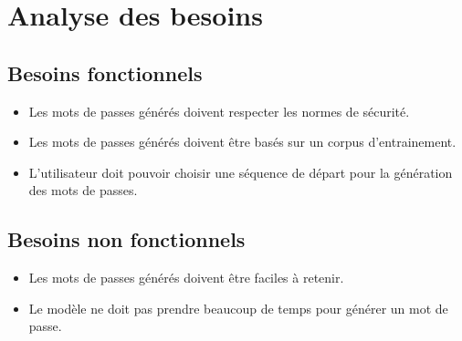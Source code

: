 \section{Analyse des besoins}
\subsection{Besoins fonctionnels}
\begin{itemize}
    \item Les mots de passes générés doivent respecter les normes de sécurité.
    \item Les mots de passes générés doivent être basés sur un corpus d'entrainement.
    \item L'utilisateur doit pouvoir choisir une séquence de départ pour la génération des mots de passes.
\end{itemize}
\subsection{Besoins non fonctionnels}
\begin{itemize}
    \item Les mots de passes générés doivent être faciles à retenir.
    \item Le modèle ne doit pas prendre beaucoup de temps pour générer un mot de passe.
\end{itemize}
